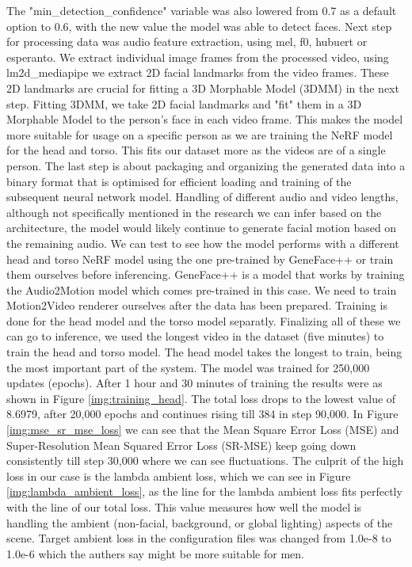 \documentclass[12pt]{article}
\begin{document}
The "min\_detection\_confidence" variable was also lowered from 0.7 as a default option to 0.6, with the new value the model was able to detect faces. Next step for processing data was audio feature extraction, using mel, f0, hubuert or esperanto. We extract individual image frames from the processed video, using lm2d\_mediapipe we extract 2D facial landmarks from the video frames. These 2D landmarks are crucial for fitting a 3D Morphable Model (3DMM) in the next step. Fitting 3DMM, we take 2D facial landmarks and "fit" them in a 3D Morphable Model to the person's face in each video frame. This makes the model more suitable for usage on a specific person as we are training the NeRF model for the head and torso. This fits our dataset more as the videos are of a single person. The last step is about packaging and organizing the generated data into a binary format that is optimised for efficient loading and training of the subsequent neural network model. Handling of different audio and video lengths, although not specifically mentioned in the research we can infer based on the architecture, the model would likely continue to generate facial motion based on the remaining audio. We can test to see how the model performs with a different head and torso NeRF model using the one pre-trained by GeneFace++ or train them ourselves before inferencing. GeneFace++ is a model that works by training the Audio2Motion model which comes pre-trained in this case. We need to train Motion2Video renderer ourselves after the data has been prepared. Training is done for the head model and the torso model separatly. Finalizing all of these we can go to inference, we used the longest video in the dataset (five minutes) to train the head and torso model. The head model takes the longest to train, being the most important part of the system. The model was trained for 250,000 updates (epochs). After 1 hour and 30 minutes of training the results were as shown in Figure \ref{img:training_head}. The total loss drops to the lowest value of 8.6979, after 20,000 epochs and continues rising till 384 in step 90,000. In Figure \ref{img:mse_sr_mse_loss} we can see that the Mean Square Error Loss (MSE) and Super-Resolution Mean Squared Error Loss (SR-MSE) keep going down consistently till step 30,000 where we can see fluctuations. The culprit of the high loss in our case is the lambda ambient loss, which we can see in Figure \ref{img:lambda_ambient_loss}, as the line for the lambda ambient loss fits perfectly with the line of our total loss. This value measures how well the model is handling the ambient (non-facial, background, or global lighting) aspects of the scene. Target ambient loss in the configuration files was changed from 1.0e-8 to 1.0e-6 which the authers say might be more suitable for men. 
\end{document}
